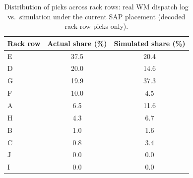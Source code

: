 \begin{table}[htbp]
\centering
\caption{Distribution of picks across rack rows: real WM dispatch log vs.\
simulation under the current SAP placement (decoded rack-row picks only).}
\label{tab:rack_share}
\begin{tabular}{lcc}
\toprule
Rack row & Actual share (\%) & Simulated share (\%) \\
\midrule
E & 37.5 & 20.4 \\
D & 20.0 & 14.6 \\
G & 19.9 & 37.3 \\
F & 10.0 & 4.5 \\
A & 6.5 & 11.6 \\
H & 4.3 & 6.7 \\
B & 1.0 & 1.6 \\
C & 0.8 & 3.4 \\
J & 0.0 & 0.0 \\
I & 0.0 & 0.0 \\
\bottomrule
\end{tabular}
\end{table}
